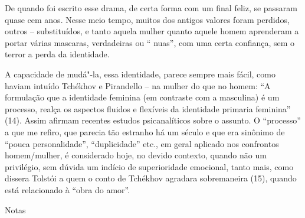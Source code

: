 De quando foi escrito esse drama, de certa forma com um final feliz, se
passaram quase cem anos. Nesse meio tempo, muitos dos antigos valores
foram perdidos, outros -- substituídos, e tanto aquela mulher quanto
aquele homem aprenderam a portar várias mascaras, verdadeiras ou ``
nuas'', com uma certa confiança, sem o terror a perda da identidade.

A capacidade de mudá"-la, essa identidade, parece sempre mais fácil, como
haviam intuído Tchékhov e Pirandello -- na mulher do que no homem: ``A
formulação que a identidade feminina (em contraste com a masculina) é um
processo, realça os aspectos fluidos e flexíveis da identidade primaria
feminina'' (14). Assim afirmam recentes estudos psicanalíticos sobre o
assunto. O ``processo'' a que me refiro, que parecia tão estranho há um
século e que era sinônimo de ``pouca personalidade'', ``duplicidade''
etc., em geral aplicado nos confrontos homem/mulher, é considerado hoje,
no devido contexto, quando não um privilégio, sem dúvida um indício de
superioridade emocional, tanto mais, como dissera Tolstói a quem o conto
de Tchékhov agradara sobremaneira (15), quando está relacionado à ``obra
do amor''.

Notas

